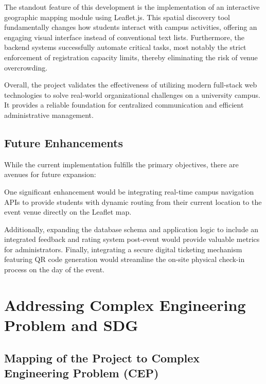 \documentclass[10pt]{report}
\begin{document}
The standout feature of this development is the implementation of an interactive geographic mapping module using Leaflet.js. This spatial discovery tool fundamentally changes how students interact with campus activities, offering an engaging visual interface instead of conventional text lists. Furthermore, the backend systems successfully automate critical tasks, most notably the strict enforcement of registration capacity limits, thereby eliminating the risk of venue overcrowding.

Overall, the project validates the effectiveness of utilizing modern full-stack web technologies to solve real-world organizational challenges on a university campus. It provides a reliable foundation for centralized communication and efficient administrative management.


\section{Future Enhancements}

While the current implementation fulfills the primary objectives, there are avenues for future expansion:

One significant enhancement would be integrating real-time campus navigation APIs to provide students with dynamic routing from their current location to the event venue directly on the Leaflet map. 

Additionally, expanding the database schema and application logic to include an integrated feedback and rating system post-event would provide valuable metrics for administrators. Finally, integrating a secure digital ticketing mechanism featuring QR code generation would streamline the on-site physical check-in process on the day of the event.

\chapter{Addressing Complex Engineering Problem and SDG}
\usepackage{}
\section{Mapping of the Project to Complex Engineering Problem (CEP)}
\end{document}
